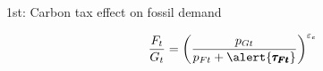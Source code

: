 \documentclass[11pt,aspectratio=169]{beamer}
\begin{document}
\begin{frame}{1st: Carbon tax effect on \alert{fossil demand}}
	\vspace{13mm}
	
	\begin{align*}
\hspace{4mm}&\frac{F_t}{G_t} = \left(\frac{p_{Gt}}{p_{Ft}+\alert{\pmb{\tau_{Ft}}}}\right)^{\varepsilon_e}
	\end{align*}


\end{frame}
\end{document}
